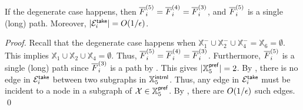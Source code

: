 \begin{lemma}\label{lm:degenerate}
	If the degenerate case happens, then
	$\overline{F}^{(5)}_i = \overline{F}^{(4)}_i = \overline{F}^{(3)}_i$, and $\overline{F}^{(5)}_i$  is a single (long) path. Moreover, $|\mathcal{E}^{\mathsf{take}}_i| = O(1/\epsilon)$.
\end{lemma}
\begin{proof} Recall that the degenerate case happens when $\mathbb{X}^{-}_1\cup \mathbb{X}^{-}_2\cup \mathbb{X}^{-}_4 = \mathbb{X}_6 =  \emptyset$. This implies $\mathbb{X}_1\cup \mathbb{X}_2\cup \mathbb{X}_4 = \emptyset$. Thus, $\overline{F}^{(5)}_i = \overline{F}^{(4)}_i = \overline{F}^{(3)}_i$. Furthermore, $\overline{F}^{(5)}_i$  is a single (long) path since $\overline{F}^{(3)}_i$ is a path by . This gives  $|\mathbb{X}_5^{\mathsf{pref}}| = 2$. By , there is no edge in $\mathcal{E}_i^{\mathsf{take}}$ between two subgraphs in $\mathbb{X}_5^{\mathsf{intrnl}}$. Thus, any edge in $\mathcal{E}_i^{\mathsf{take}}$ must be incident to a node in a subgraph of $\mathcal{X} \in\mathbb{X}_5^{\mathsf{pref}}$. By , there are $O(1/\epsilon)$ such edges.	\qed
\end{proof}



